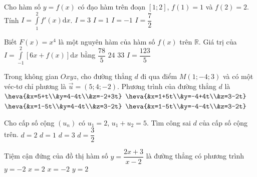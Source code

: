 \begin{ex}%
	Cho hàm số $y=f(x)$  có  đạo hàm trên đoạn $[1;2]$, $f(1)=1$ và $f(2)=2$. Tính \break $I=\displaystyle \int \limits_1^2 f'(x)\mathrm{d}x$.
\choice
{ $I=3$}
{\True $I=1$}
{$I=-1$}
{$I=\dfrac{7}{2}$}
\end{ex}

\begin{ex}%
Biết  $F(x)=x^4$ là một nguyên hàm của hàm số  $f(x)$ trên  $\mathbb{R}$. Giá trị của    $I=\displaystyle \int \limits_{-1}^2 [6x+f(x)]\mathrm{d}x$ bằng
\choice
{ $\dfrac{78}{5}$}
{\True $24$}
{$33$}
{$I=\dfrac{123}{5}$}
\end{ex}

\begin{ex}%
Trong không gian  $Oxyz$, cho đường thẳng  $d$  đi qua điểm  $M(1;-4;3)$  và có một véc-tơ chỉ phương là  $\vec{u}=(5;4;-2)$. Phương trình của  đường thẳng  $d$ là
\choice
{ $\heva{&x=5+t\\&y=4-4t\\&z=-2+3t}$}
{\True $\heva{&x=1+5t\\&y=-4+4t\\&z=3-2t}$}
{$\heva{&x=1-5t\\&y=4-4t\\&z=3-2t}$}
{$\heva{&x=1-5t\\&y=-4-4t\\&z=3-2t}$}
\end{ex}

\begin{ex}%
Cho cấp số cộng $(u_n)$ có $u_1=2$, $u_1+u_2=5$. Tìm công sai $d$ của cấp số cộng trên.
\choice
{ $d=2$}
{\True $d=1$}
{$d=3$}
{$d=\dfrac{3}{2}$}
\end{ex}

\begin{ex}%
Tiệm cận đứng của đồ thị hàm số  $y=\dfrac{2x+3}{x-2}$  là đường thẳng có phương trình
\choice
{ $y=-2$}
{\True $x=2$}
{$x=-2$}
{$y=2$}
\end{ex}

